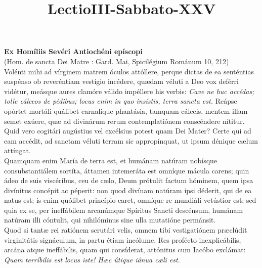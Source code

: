 \documentclass[options]{article}
\title{LectioIII-Sabbato-XXV}
\begin{document}
	\textbf{Ex Homíliis Sevéri Antiochéni epíscopi}\\
	(Hom. de sancta Dei Matre : Gard. Mai, Spicilégium Románum 10, 212)\\
	Volénti mihi ad vírginem matrem óculos attóllere, perque dictas de ea senténtias suspénso ob reveréntiam vestígio incédere, quædam véluti a Deo vox deférri vidétur, meásque aures clamóre válido impéllere his verbis:
	\textit{Cave ne huc accédas; tolle cálceos de pédibus; locus enim in quo insístis, terra sancta est.}
	Reápse opórtet mortáli quálibet carnalíque phantásia, tamquam cálceis, mentem illam semet exúere, quæ ad divinárum rerum contemplatiónem conscéndere nítitur. Quid vero cogitári augústius vel excélsius potest quam Dei Mater? Certe qui ad eam accédit, ad sanctam véluti terram sic appropínquat, ut ipsum dénique cælum attíngat.\\
	
	Quamquam enim María de terra est, et humánam natúram nobísque consubstantiálem sortíta, áttamen intemeráta est omníque mácula carens; quin ádeo de suis viscéribus, ceu de cælo, Deum prótulit factum hóminem, quem ipsa divínitus concépit ac péperit: non quod divínam natúram ipsi déderit, qui de ea natus est; is enim quólibet princípio caret, omníque re mundiáli vetústior est; sed quia ex se, per ineffábilem arcanúmque Spíritus Sancti descénsum, humánam natúram illi cóntulit, qui nihilóminus sine ulla mutatióne permánsit.\\
	
	Quod si tantæ rei ratiónem scrutári velis, omnem tibi vestigatiónem præclúdit virginitátis signáculum, in partu étiam incólume. Res profécto inexplicábilis, arcána atque ineffábilis, quam qui consíderat, attónitus cum Iacóbo exclámat:
	\textit{Quam terríbilis est locus iste! Hæc útique iánua cæli est.}
	
	
\end{document}
